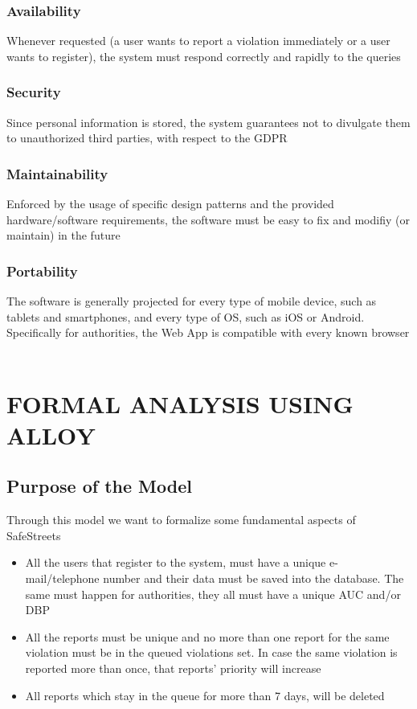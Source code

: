 \documentclass[12pt,a4paper]{article}
\begin{document}
\subsubsection{Availability}
Whenever requested (a user wants to report a violation immediately or a user wants to register), the system must respond correctly and rapidly to the queries
\subsubsection{Security}
Since personal information is stored, the system guarantees not to divulgate them to unauthorized third parties, with respect to the GDPR
\subsubsection{Maintainability}
Enforced by the usage of specific design patterns and the provided hardware/software requirements, the software must be easy to fix and modifiy (or maintain) in the future
\subsubsection{Portability}
The software is generally projected for every type of mobile device, such as tablets and smartphones, and every type of OS, such as iOS or Android. Specifically for authorities, the Web App is compatible with every known browser
\\\\
\section{FORMAL ANALYSIS USING ALLOY}
\subsection{Purpose of the Model}
Through this model we want to formalize some fundamental aspects of SafeStreets
\begin{itemize}
				\item All the users that register to the system, must have a unique e-mail/telephone number and their data must be saved into the database. \newline The same must happen for authorities, they all must have a unique AUC and/or DBP
				\item All the reports must be unique and no more than one report for the same violation must be in the queued violations set. \newline In case the same violation is reported more than once, that reports' priority will increase
				\item All reports which stay in the queue for more than 7 days, will be deleted
\end{itemize}
\end{document}
